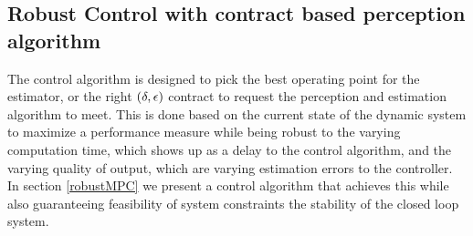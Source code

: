 \subsection{Robust Control with contract based perception algorithm}

The control algorithm is designed to pick the best operating point for the estimator, or the right $(\delta,\epsilon)$ contract to request the perception and estimation algorithm to meet. This is done based on the current state of the dynamic system to maximize a performance measure while being robust to the varying computation time, which shows up as a delay to the control algorithm, and the varying quality of output, which are varying estimation errors to the controller. In section \ref{robustMPC} we present a control algorithm that achieves this while also guaranteeing feasibility of system constraints the stability of the closed loop system.






